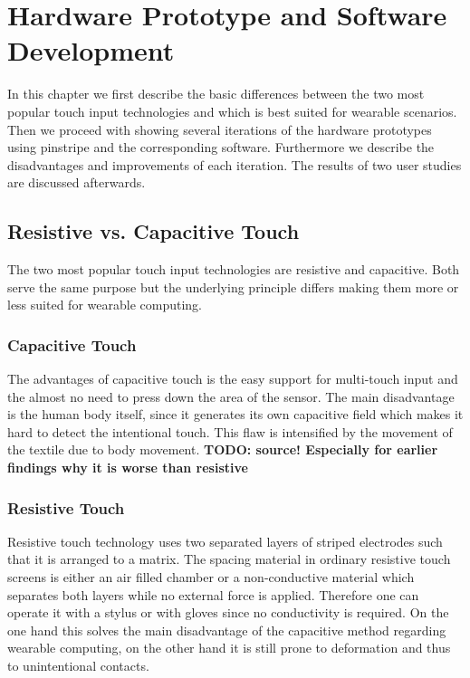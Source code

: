 %

\chapter{Hardware Prototype and Software Development}
\label{Hardware Prototype and Software Development} 
In this chapter we first describe the basic differences between the two most popular touch input technologies and which is best suited for wearable scenarios. Then we proceed with showing several iterations of the hardware prototypes using pinstripe and the corresponding software. Furthermore we describe the disadvantages and improvements of each iteration. The results of two user studies are discussed afterwards. 
\section{Resistive vs. Capacitive Touch}
The two most popular touch input technologies are resistive and capacitive. Both serve the same purpose but the underlying principle differs making them more or less suited for wearable computing. 
\subsection{Capacitive Touch}

The advantages of capacitive touch is the easy support for multi-touch input and the almost no need to press down the area of the sensor. The main disadvantage is the human body itself, since  it generates its own capacitive field which makes it hard to detect the intentional touch. This flaw is intensified by the movement of the textile due to body movement. \textbf{TODO: source! Especially for earlier findings why it is worse than resistive}

\subsection{Resistive Touch}
Resistive touch technology uses two separated layers of striped electrodes such that it is arranged to a matrix. The spacing material in ordinary resistive touch screens is either an air filled chamber or a non-conductive material which separates both layers while no external force is applied. Therefore one can operate it with a stylus or with gloves since no conductivity is required. On the one hand this solves the main disadvantage of the capacitive method regarding wearable computing, on the other hand it is still prone to deformation and thus to unintentional contacts.

